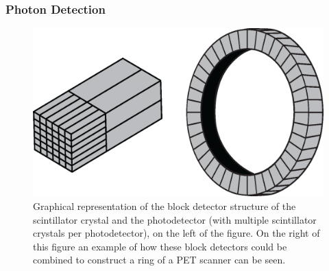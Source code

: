             \subsubsection{Photon Detection} \label{sec:photon_detection}
                \begin{figure}
                    \centering
                    
                    \includegraphics[width=1.0\linewidth]{figures/background_detector.png}
                    
                    \captionsetup{singlelinecheck=false}
                    \caption{
                        Graphical representation of the block detector structure of the scintillator crystal and the photodetector (with multiple scintillator crystals per photodetector), on the left of the figure. On the right of this figure an example of how these block detectors could be combined to construct a ring of a \gls{PET} scanner can be seen.
                    }
                    \label{fig:photon_detection_detector}
                \end{figure}
                
